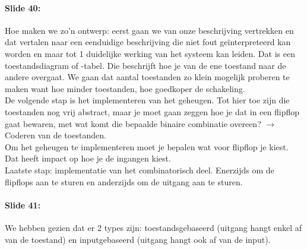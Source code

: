 \documentclass[10pt,a4paper]{book}
\begin{document}
\paragraph{Slide 40:} Hoe maken we zo'n ontwerp: eerst gaan we van onze beschrijving vertrekken en dat vertalen naar een eenduidige beschrijving die niet fout ge\"interpreteerd kan worden en maar tot 1 duidelijke werking van het systeem kan leiden. Dat is een toestandsdiagram of -tabel. Die beschrijft hoe je van de ene toestand naar de andere overgaat. We gaan dat aantal toestanden zo klein mogelijk proberen te maken want hoe minder toestanden, hoe goedkoper de schakeling.\\
De volgende stap is het implementeren van het geheugen. Tot hier toe zijn die toestanden nog vrij abstract, maar je moet gaan zeggen hoe je dat in een flipflop gaat bewaren, met wat komt die bepaalde binaire combinatie overeen? $\rightarrow$ Coderen van de toestanden.\\
Om het geheugen te implementeren moet je bepalen wat voor flipflop je kiest. Dat heeft impact op hoe je de ingangen kiest.\\
Laatste stap: implementatie van het combinatorisch deel. Enerzijds om de flipflops aan te sturen en anderzijds om de uitgang aan te sturen.

\paragraph{Slide 41:} We hebben gezien dat er 2 types zijn: toestandsgebaseerd (uitgang hangt enkel af van de toestand) en inputgebaseerd (uitgang hangt ook af van de input).
\end{document}
